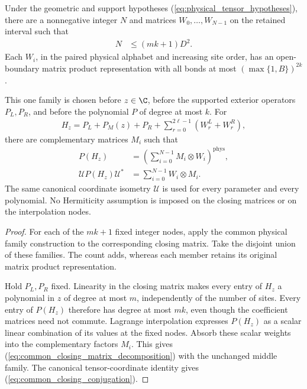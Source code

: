 \begin{lemma}
    \label{thm:common_closing_polynomial_family}
    \leanok
    Under the geometric and support hypotheses
    (\ref{eq:physical_tensor_hypotheses}), there are a nonnegative integer
    $N$ and matrices $W_0,\ldots,W_{N-1}$ on the retained interval such that
    \begin{align}
        N & \leq(mk+1)D^2.
        \label{eq:common_closing_family_count}
    \end{align}
    Each $W_i$, in the paired physical alphabet and increasing site order,
    has an open-boundary matrix product representation with all bonds at
    most $(\max\{1,B\})^{2k}$.

    This one family is chosen before $z\in\C$, before the supported
    exterior operators $P_L,P_R$, and before the polynomial $P$ of degree
    at most $k$. For
    \begin{align}
        H_z=P_L+P_M(z)+P_R+
        \sum_{r=0}^{2\ell-1}(W^L_r+W^R_r),
        \label{eq:common_closing_hamiltonian}
    \end{align}
    there are complementary matrices $M_i$ such that
    \begin{align}
        P(H_z) & =\left(\sum_{i=0}^{N-1}M_i\otimes W_i\right)^{\mathrm{phys}},
        \label{eq:common_closing_matrix_decomposition}                         \\
        \mathcal U P(H_z)\mathcal U^*
               & =\sum_{i=0}^{N-1}W_i\otimes M_i.
        \label{eq:common_closing_conjugation}
    \end{align}
    The same canonical coordinate isometry $\mathcal U$ is used for every
    parameter and every polynomial. No Hermiticity assumption is imposed
    on the closing matrices or on the interpolation nodes.
\end{lemma}
\begin{proof}
    \leanok
    For each of the $mk+1$ fixed integer nodes, apply the common physical
    family construction to the corresponding closing matrix. Take the
    disjoint union of these families. The count adds, whereas each member
    retains its original matrix product representation.

    Hold $P_L,P_R$ fixed. Linearity in the closing matrix makes every
    entry of $H_z$ a polynomial in $z$ of degree at most $m$, independently
    of the number of sites. Every entry of $P(H_z)$ therefore has degree
    at most $mk$, even though the coefficient matrices need not commute.
    Lagrange interpolation expresses $P(H_z)$ as a scalar linear
    combination of its values at the fixed nodes. Absorb these scalar
    weights into the complementary factors $M_i$. This gives
    (\ref{eq:common_closing_matrix_decomposition}) with the unchanged
    middle family. The canonical tensor-coordinate identity gives
    (\ref{eq:common_closing_conjugation}).
\end{proof}

